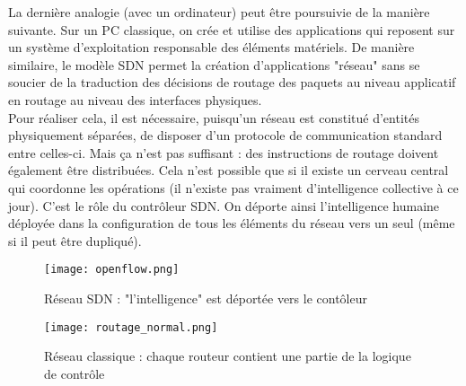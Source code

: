 La dernière analogie (avec un ordinateur) peut être poursuivie de la manière suivante. Sur un PC classique, on crée et utilise des applications qui reposent sur un système d'exploitation responsable des éléments matériels. De manière similaire, le modèle SDN permet la création d'applications "réseau" sans se soucier de la traduction des décisions de routage des paquets au niveau applicatif en routage au niveau des interfaces physiques.\\

Pour réaliser cela, il est nécessaire, puisqu'un réseau est constitué d'entités physiquement séparées, de disposer d'un protocole de communication standard entre celles-ci. Mais ça n'est pas suffisant : des instructions de routage doivent également être distribuées. Cela n'est possible que si il existe un cerveau central qui coordonne les opérations (il n'existe pas vraiment d'intelligence collective à ce jour). C'est le rôle du contrôleur SDN. On déporte ainsi l'intelligence humaine déployée dans la configuration de tous les éléments du réseau vers un seul (même si il peut être dupliqué).\\

\begin{figure}[h]
  	\centering
  	\texttt{[image: openflow.png]}
  	\caption[Caption for LOF]{Réseau SDN : "l'intelligence" est déportée vers le contôleur \footnotemark}
\end{figure}


\begin{figure}[h]
  	\centering
  	\texttt{[image: routage\_normal.png]}
  	\caption{Réseau classique : chaque routeur contient une partie de la logique de contrôle}
\end{figure}

